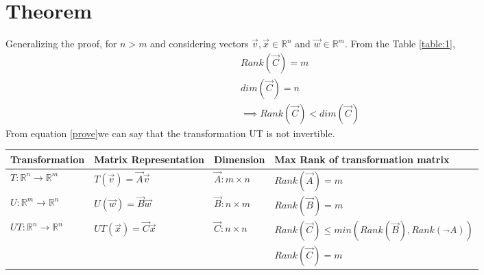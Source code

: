 \documentclass[journal,12pt,twocolumn]{IEEEtran}
\begin{document}
\section{Theorem}
Generalizing the proof, for $n>m$ and considering vectors $\vec{v},\vec{x}\in\mathbb{R}^n$ and $\vec{w}\in\mathbb{R}^m$. From the Table \ref{table:1}, 
\begin{align}
Rank(\vec{C})=m\\
dim(\vec{C})=n\\
\implies Rank(\vec{C})<dim(\vec{C})\label{prove}
\end{align}
From equation \eqref{prove}we can say that the transformation UT is not invertible. 
\begin{table*}[h!]
\begin{center}
\begin{tabular}{|l|l|l|l|}
\hline
\textbf{Transformation}&\textbf{Matrix Representation}&\textbf{Dimension}&\textbf{Max Rank  of transformation matrix}\\[0.5ex]
\hline
$T:\mathbb{R}^n\rightarrow\mathbb{R}^m$ & $T(\vec{v})=\vec{A}\vec{v}$ & $\vec{A}:m\times n$ & $Rank(\vec{A})=m$\\[0.5ex]
\hline
$U:\mathbb{R}^m\rightarrow\mathbb{R}^n$ & $U(\vec{w})=\vec{B}\vec{w}$ & $\vec{B}:n\times m$ & $Rank(\vec{B})=m$\\[0.5ex]
\hline
$UT:\mathbb{R}^n\rightarrow\mathbb{R}^n$ & $UT(\vec{x})=\vec{C}\vec{x}$ & $\vec{C}:n\times n$ & $Rank(\vec{C})\le min(Rank(\vec{B}),Rank(\vec{}A))$\\[0.5ex]
&&&$Rank(\vec{C})=m$\\[0.5ex]
\hline
\end{tabular}
\caption{Generalization of the proof }
\label{table:1}
\end{center}
\vspace{-0.5cm}
\end{table*}
\end{document}
